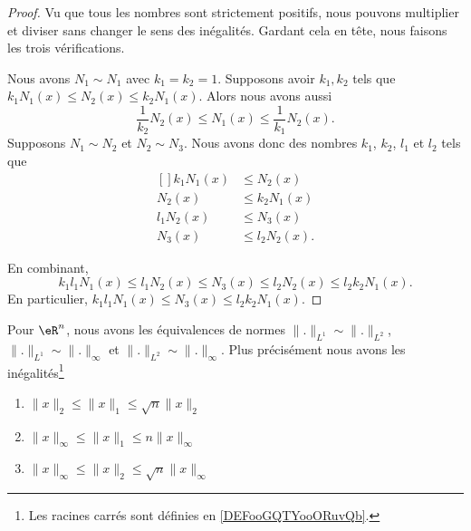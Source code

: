 \begin{proof}
	Vu que tous les nombres sont strictement positifs, nous pouvons multiplier et diviser sans changer le sens des inégalités. Gardant cela en tête, nous faisons les trois vérifications.
	\begin{subproof}
		\spitem[réflexive]
		Nous avons \( N_1\sim N_1\) avec \( k_1=k_2=1\).
		\spitem[Symétrique]
		Supposons avoir \( k_1,k_2\) tels que \( k_1N_1(x)\leq N_2(x)\leq k_2N_1(x)\). Alors nous avons aussi
		\begin{equation}
			\frac{1}{ k_2 }N_2(x)\leq N_1(x)\leq \frac{ 1 }{ k_1 }N_2(x).
		\end{equation}
		\spitem[Transitive]
		Supposons \( N_1\sim N_2\) et \( N_2\sim N_3\). Nous avons donc des nombres \( k_1\), \( k_2\), \( l_1\) et \( l_2\) tels que
		\begin{equation}
			\begin{aligned}[]
				k_1N_1(x) & \leq N_2(x)     \\
				N_2(x)    & \leq k_2N_1(x)  \\
				l_1N_2(x) & \leq N_3(x)     \\
				N_3(x)    & \leq l_2N_2(x).
			\end{aligned}
		\end{equation}
	\end{subproof}
	En combinant,
	\begin{equation}
		k_1l_1N_1(x)\leq l_1N_2(x)\leq N_3(x)\leq l_2N_2(x)\leq l_2k_2N_1(x).
	\end{equation}
	En particulier, $k_1l_1N_1(x) \leq N_3(x)\leq l_2k_2N_1(x)$.
\end{proof}

\begin{proposition} \label{PropLJEJooMOWPNi}
	Pour \( \eR^n\), nous avons les équivalences de normes \( \| . \|_{L^1}\sim\| . \|_{L^2}\), \( \| . \|_{L^1}\sim\| . \|_{\infty}\) et \( \| . \|_{L^2}\sim\| . \|_{\infty}\). Plus précisément nous avons les inégalités\footnote{Les racines carrés sont définies en \ref{DEFooGQTYooORuvQb}.}
	\begin{enumerate}
		\item\label{ItemABSGooQODmLNi}
		      \(  \| x \|_2\leq \| x \|_1\leq\sqrt{n}\| x \|_2\)
		\item\label{ItemABSGooQODmLNii}
		      \( \| x \|_{\infty}\leq \| x \|_1\leq n \| x \|_{\infty}\)
		\item\label{ItemABSGooQODmLNiii}
		      \( \| x \|_{\infty}\leq \| x \|_2\leq \sqrt{n}\| x \|_{\infty}\)
	\end{enumerate}
\end{proposition}

